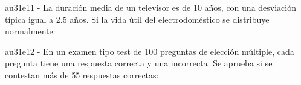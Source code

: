 \documentclass[spanish, 11pt]{exam}
\begin{document}
\begin{questions}
        \begin{multicols}{3}
        \end{multicols}
        \question au31e11 - La duración media de un televisor es de 10 años, con una desviación típica igual a 2.5 años. Si la
vida útil del electrodoméstico se distribuye normalmente: 
    
        \begin{multicols}{1}
        \end{multicols}
        \question au31e12 - En un examen tipo test de 100 preguntas de elección múltiple, cada pregunta tiene una
respuesta correcta y una incorrecta. Se aprueba si se contestan más de 55 respuestas correctas: 
    

\end{questions}
\end{document}
